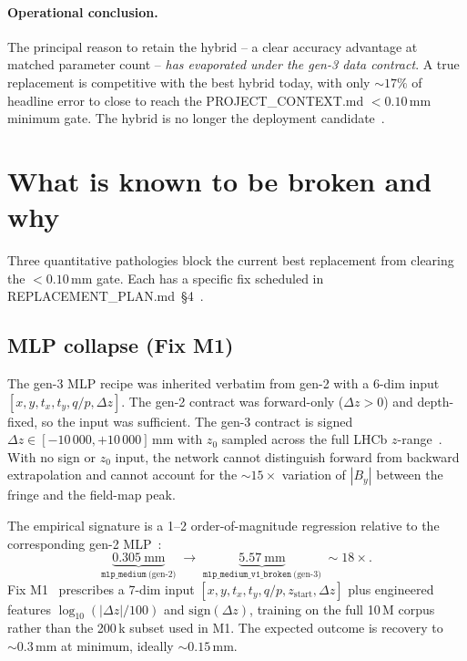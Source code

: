 \documentclass[11pt,a4paper]{article}
\begin{document}
\paragraph{Operational conclusion.} The principal reason to retain the
hybrid -- a clear accuracy advantage at matched parameter count --
\emph{has evaporated under the gen-3 data contract}. A true
replacement is competitive with the best hybrid today, with only
$\sim 17\%$ of headline error to close to reach the
PROJECT\_CONTEXT.md $<0.10$\,mm minimum gate. The hybrid is no longer
the deployment candidate~\cite{adr0009, cleanuplist}.

\section{What is known to be broken and why}\label{sec:broken}

Three quantitative pathologies block the current best replacement
from clearing the $<0.10$\,mm gate. Each has a specific fix scheduled
in REPLACEMENT\_PLAN.md~\S 4~\cite{replacementplan}.

\subsection{MLP collapse (Fix M1)}\label{sec:m1collapse}

The gen-3 MLP recipe was inherited verbatim from gen-2 with a 6-dim
input $[x, y, t_x, t_y, q/p, \Delta z]$. The gen-2 contract was
forward-only ($\Delta z>0$) and depth-fixed, so the input was
sufficient. The gen-3 contract is signed
$\Delta z \in [-10\,000, +10\,000]$\,mm with $z_0$
sampled across the full LHCb $z$-range~\cite{gen3readme}. With no
sign or $z_0$ input, the network cannot distinguish forward from
backward extrapolation and cannot account for the $\sim 15\times$
variation of $|B_y|$ between the fringe and the field-map peak.

The empirical signature is a 1--2 order-of-magnitude regression
relative to the corresponding gen-2 MLP~\cite{gen2readme,
gen3readme}:
\[
\underbrace{0.305~\text{mm}}_{\texttt{mlp\_medium}~\text{(gen-2)}}
\;\longrightarrow\;
\underbrace{5.57~\text{mm}}_{\texttt{mlp\_medium\_v1\_broken}~\text{(gen-3)}}
\;\sim 18\times.
\]
Fix M1~\cite{replacementplan} prescribes a 7-dim input
$[x, y, t_x, t_y, q/p, z_{\mathrm{start}}, \Delta z]$ plus
engineered features $\log_{10}(|\Delta z|/100)$ and
$\mathrm{sign}(\Delta z)$, training on the full 10\,M corpus rather
than the 200\,k subset used in M1. The expected outcome is recovery
to $\sim 0.3$\,mm at minimum, ideally $\sim 0.15$\,mm.
\end{document}
